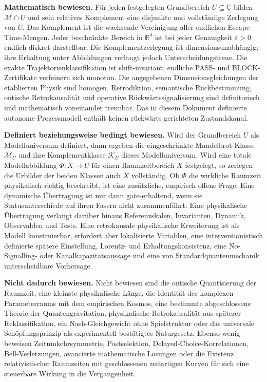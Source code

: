 \documentclass[11pt,a4paper]{article}
\theoremstyle{remark}
\newcommand{\M}{\mathcal{M}}
\newcommand{\K}{\mathcal{K}}
\newcommand{\C}{\mathbb{C}}
\newcommand{\R}{\mathbb{R}}
\newcommand{\eps}{\varepsilon}
\newcommand{\statusbox}[2]{%
  \par\medskip\noindent
  \colorbox{#1}{\parbox{\dimexpr\linewidth-2\fboxsep\relax}{#2}}%
  \par\medskip
}
\begin{document}
\statusbox{QGreen}{
\textbf{Mathematisch bewiesen.}
Für jeden festgelegten Grundbereich \(U\subseteq\C\) bilden
\(\M\cap U\) und sein relatives Komplement eine disjunkte und vollständige
Zerlegung von \(U\). Das Komplement ist die wachsende Vereinigung aller
endlichen Escape-Time-Mengen. Jeder beschränkte Bereich in \(\R^d\) ist bei
jeder Genauigkeit \(\eps>0\) endlich diskret darstellbar. Die
Komplementzerlegung ist dimensionsunabhängig; ihre Erhaltung unter
Abbildungen verlangt jedoch Unterscheidungstreue. Die exakte
Trajektorienklassifikation ist shift-invariant; endliche PASS- und
BLOCK-Zertifikate verfeinern sich monoton. Die angegebenen
Dimensionsgleichungen der etablierten Physik sind homogen. Retrodiktion,
semantische Rückbestimmung, ontische Retrokausalität und operative
Rückwärtssignalisierung sind definitorisch und mathematisch voneinander
trennbar. Das in diesem Dokument definierte autonome Prozessmodell enthält
keinen rückwärts gerichteten Zustandskanal.
}

\statusbox{QAmber}{
\textbf{Definiert beziehungsweise bedingt bewiesen.}
Wird der Grundbereich \(U\) als Modelluniversum definiert, dann ergeben
die eingeschränkte Mandelbrot-Klasse \(\M_U\) und ihre Komplementklasse
\(\K_U\) dieses Modelluniversum. Wird eine totale
Modellabbildung \(\Phi:X\to U\) für einen Raumzeitbereich \(X\) festgelegt,
so zerlegen die Urbilder der beiden Klassen auch \(X\) vollständig. Ob
\(\Phi\) die wirkliche Raumzeit physikalisch richtig beschreibt, ist eine
zusätzliche, empirisch offene Frage. Eine dynamische Übertragung ist nur dann
gate-erhaltend, wenn sie Statusunterschiede auf ihren Fasern nicht
zusammenführt. Eine physikalische Übertragung verlangt darüber hinaus
Referenzskalen, Invarianten, Dynamik, Observablen und Tests.
Eine retrokausale physikalische Erweiterung ist als Modell konstruierbar,
erfordert aber lokalisierte Variablen, eine interventionistisch definierte
spätere Einstellung, Lorentz- und Erhaltungskonsistenz, eine No-Signalling-
oder Kanalkapazitätsaussage und eine von Standardquantenmechanik
unterscheidbare Vorhersage.
}

\statusbox{QRed}{
\textbf{Nicht dadurch bewiesen.}
Nicht bewiesen sind die ontische Quantisierung der Raumzeit, eine kleinste
physikalische Länge, die Identität des komplexen Parameterraums mit dem
empirischen Kosmos, eine bestimmte abgeschlossene Theorie der
Quantengravitation, physikalische Retrokausalität aus späterer
Reklassifikation, ein Nash-Gleichgewicht ohne Spielstruktur oder das
universale Schöpfungsprinzip als experimentell bestätigtes Naturgesetz.
Ebenso wenig beweisen Zeitumkehrsymmetrie, Postselektion,
Delayed-Choice-Korrelationen, Bell-Verletzungen, avancierte mathematische
Lösungen oder die Existenz relativistischer Raumzeiten mit geschlossenen
zeitartigen Kurven für sich eine steuerbare Wirkung in die Vergangenheit.
}
\end{document}
